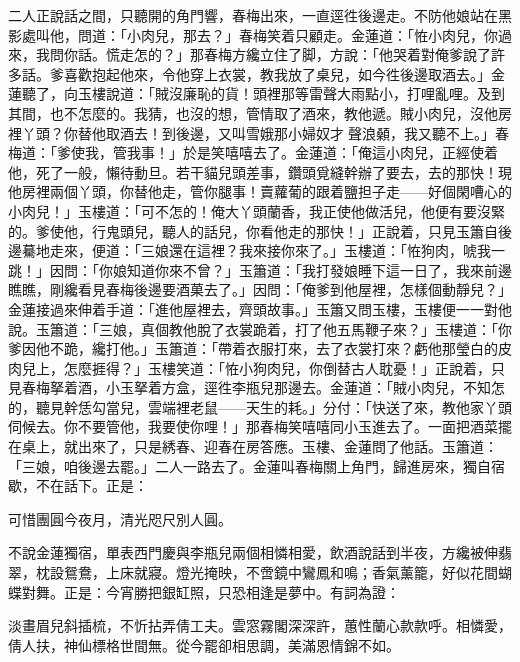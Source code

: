 二人正說話之間，只聽開的角門響，春梅出來，一直逕徃後邊走。不防他娘站在黑影處叫他，問道：「小肉兒，那去？」春梅笑着只顧走。{}金蓮道：「恠小肉兒，你過來，我問你話。慌走怎的？」那春梅方纔立住了脚，方說：「他哭着對俺爹說了許多話。爹喜歡抱起他來，令他穿上衣裳，教我放了桌兒，如今徃後邊取酒去。」金蓮聽了，向玉樓說道：「賊沒廉恥的貨！頭裡那等雷聲大雨點小，打哩亂哩。及到其間，也不怎麼的。我猜，也沒的想，管情取了酒來，教他遞。{}賊小肉兒，沒他房裡丫頭？你替他取酒去！到後邊，又叫雪娥那小婦奴才𣭈聲浪顙，{}我又聽不上。」春梅道：「爹使我，管我事！」於是笑嘻嘻去了。金蓮道：「俺這小肉兒，正經使着他，死了一般，懶待動旦。{}若干貓兒頭差事，鑽頭覓縫幹辦了要去，去的那快！現他房裡兩個丫頭，你替他走，管你腿事！賣蘿葡的跟着鹽担子走——好個閑嘈心的小肉兒！」玉樓道：「可不怎的！俺大丫頭蘭香，我正使他做活兒，他便有要沒緊的。爹使他，行鬼頭兒，聽人的話兒，你看他走的那快！」正說着，只見玉簫自後邊驀地走來，便道：「三娘還在這裡？我來接你來了。」玉樓道：「恠狗肉，唬我一跳！」{}因問：「你娘知道你來不曾？」玉簫道：「我打發娘睡下這一日了，我來前邊瞧瞧，剛纔看見春梅後邊要酒菓去了。」因問：「俺爹到他屋裡，怎樣個動靜兒？」金蓮接過來伸着手道：「進他屋裡去，齊頭故事。」{}玉簫又問玉樓，玉樓便一一對他說。玉簫道：「三娘，真個教他脫了衣裳跪着，打了他五馬鞭子來？」玉樓道：「你爹因他不跪，纔打他。」玉簫道：「帶着衣服打來，去了衣裳打來？虧他那瑩白的皮肉兒上，怎麼捱得？」{}玉樓笑道：「恠小狗肉兒，你倒替古人耽憂！」正說着，只見春梅拏着酒，小玉拏着方盒，逕徃李瓶兒那邊去。金蓮道：「賊小肉兒，不知怎的，聽見幹恁勾當兒，雲端裡老鼠——天生的耗。」分付：「快送了來，教他家丫頭伺候去。你不要管他，我要使你哩！」那春梅笑嘻嘻同小玉進去了。一面把酒菜擺在桌上，就出來了，只是綉春、迎春在房答應。玉樓、金蓮問了他話。玉簫道：「三娘，咱後邊去罷。」二人一路去了。金蓮叫春梅關上角門，歸進房來，獨自宿歇，不在話下。正是：

可惜團圓今夜月，清光咫尺別人圓。

不說金蓮獨宿，單表西門慶與李瓶兒兩個相憐相愛，飲酒說話到半夜，方纔被伸翡翠，枕設鴛鴦，上床就寢。燈光掩映，不啻鏡中鸞鳳和鳴；香氣薰籠，好似花間蝴蝶對舞。正是：今宵勝把銀缸照，只恐相逢是夢中。有詞為證：

淡畫眉兒斜插梳，不忻拈弄倩工夫。雲窓霧閣深深許，蕙性蘭心款款呼。相憐愛，倩人扶，神仙標格世間無。從今罷卻相思調，美滿恩情錦不如。

